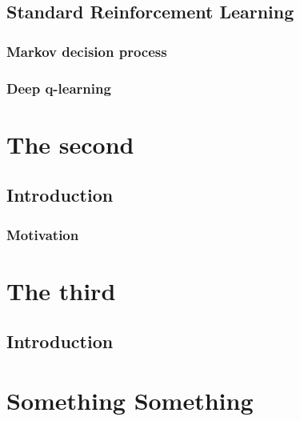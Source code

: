 \documentclass[hidelinks, a4paper, 14pt]{extreport}
\begin{document}
\newpage
\section{Standard Reinforcement Learning}\label{}

\subsection{Markov decision process}

\subsection{Deep q-learning}

\chapter{The second}

\newpage
\section{Introduction}

\subsection{Motivation}


\chapter{The third}

\newpage
\section{Introduction}

\appendix
\chapter{Something Something}


         
\end{document}

